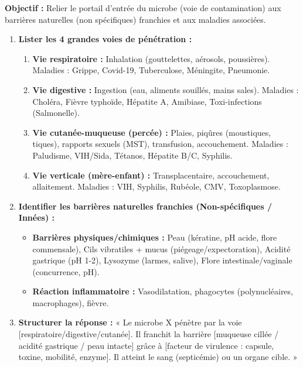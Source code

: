 \documentclass[11pt]{article}
\begin{document}
\begin{methode}
    \textbf{Objectif :} Relier le portail d'entrée du microbe (voie de contamination) aux barrières naturelles (non spécifiques) franchies et aux maladies associées.
    \begin{enumerate}
        \item \textbf{Lister les 4 grandes voies de pénétration :}
            \begin{enumerate}
                \item \textbf{Vie respiratoire :} Inhalation (gouttelettes, aérosols, poussières). Maladies : Grippe, Covid-19, Tuberculose, Méningite, Pneumonie.
                \item \textbf{Vie digestive :} Ingestion (eau, aliments souillés, mains sales). Maladies : Choléra, Fièvre typhoïde, Hépatite A, Amibiase, Toxi-infections (Salmonelle).
                \item \textbf{Vie cutanée-muqueuse (percée) :} Plaies, piqûres (moustiques, tiques), rapports sexuels (MST), transfusion, accouchement. Maladies : Paludisme, VIH/Sida, Tétanos, Hépatite B/C, Syphilis.
                \item \textbf{Vie verticale (mère-enfant) :} Transplacentaire, accouchement, allaitement. Maladies : VIH, Syphilis, Rubéole, CMV, Toxoplasmose.
            \end{enumerate}
        \item \textbf{Identifier les barrières naturelles franchies (Non-spécifiques / Innées) :}
            \begin{itemize}
                \item \textbf{Barrières physiques/chimiques :} Peau (kératine, pH acide, flore commensale), Cils vibratiles + mucus (piégeage/expectoration), Acidité gastrique (pH 1-2), Lysozyme (larmes, salive), Flore intestinale/vaginale (concurrence, pH).
                \item \textbf{Réaction inflammatoire :} Vasodilatation, phagocytes (polynucléaires, macrophages), fièvre.
            \end{itemize}
        \item \textbf{Structurer la réponse :} « Le microbe X pénètre par la voie [respiratoire/digestive/cutanée]. Il franchit la barrière [muqueuse cillée / acidité gastrique / peau intacte] grâce à [facteur de virulence : capsule, toxine, mobilité, enzyme]. Il atteint le sang (septicémie) ou un organe cible. »
    \end{enumerate}
\end{methode}
\end{document}
